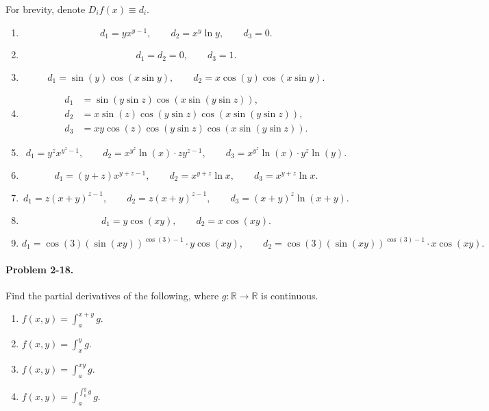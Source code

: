 \documentclass[11pt]{report}
\newcommand{\R}{\mathbb{R}}
\newcommand{\problem}[1]{\paragraph{Problem #1.}}
\begin{document}
    For brevity, denote $D_if(x) \equiv d_i$.
    \begin{enumerate}
        \item \[
            d_1 = yx^{y - 1}, \qquad
            d_2 = x^y\ln{y}, \qquad
            d_3 = 0.
        \] 

        \item \[
            d_1 = d_2 = 0, \qquad d_3 = 1.
        \] 

        \item \[
            d_1 = \sin(y) \cos(x\sin{y}), \qquad
            d_2 = x\cos(y)\cos(x\sin{y}).
        \] 

        \item \begin{align*}
            d_1 &= \sin(y\sin{z})\cos(x\sin(y\sin{z})), \\
            d_2 &= x\sin(z)\cos(y\sin{z})\cos(x\sin(y\sin{z})), \\
            d_3 &= xy\cos(z)\cos(y\sin{z})\cos(x\sin(y\sin{z})).
        \end{align*}

        \item \[
            d_1 = y^z x^{y^z - 1}, \qquad
            d_2 = x^{y^z}\ln(x)\cdot z y^{z - 1}, \qquad
            d_3 = x^{y^z}\ln(x)\cdot y^z \ln(y).
        \]

        \item \[
            d_1 = (y + z)x^{y + z - 1}, \qquad 
            d_2 = x^{y + z}\ln{x}, \qquad
            d_3 = x^{y + z}\ln{x}.
        \] 

        \item \[
            d_1 = z(x + y)^{z - 1}, \qquad 
            d_2 = z(x + y)^{z - 1}, \qquad
            d_3 = (x + y)^z \ln(x + y).
        \] 

        \item \[
            d_1 = y\cos(xy), \qquad 
            d_2 = x\cos(xy).
        \] 

        \item \[
            d_1 = \cos(3)(\sin(xy))^{\cos(3) - 1}\cdot y\cos(xy), \qquad
            d_2 = \cos(3)(\sin(xy))^{\cos(3) - 1}\cdot x\cos(xy).
        \] 
    \end{enumerate}


    \problem{2-18} Find the partial derivatives of the following, where $g\colon \R
    \to \R$ is continuous.
    \begin{enumerate}
        \item $f(x, y) = \int_a^{x + y} g$.
        \item $f(x, y) = \int_x^y g$.
        \item $f(x, y) = \int_a^{xy} g$.
        \item $f(x, y) = \int_{a}^{\int_b^y g} g$.
    \end{enumerate}
\end{document}
